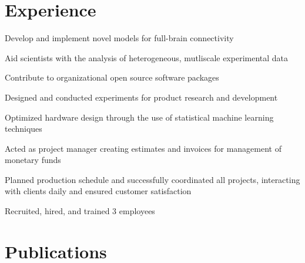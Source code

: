 \documentclass[]{deedy-resume-openfont}
\begin{document}
\begin{minipage}[t]{0.63\textwidth}


\section{Experience}
\vspace{\topsep}
\begin{tightemize}
\item {Develop and implement novel models for full-brain connectivity}
\item {Aid scientists with the analysis of heterogeneous, mutliscale experimental data}
\item {Contribute to organizational open source software packages}
\end{tightemize}
\sectionsep

\begin{tightemize}
\item {Designed and conducted experiments for product research and development}
\item {Optimized hardware design through the use of statistical machine learning techniques}
\end{tightemize}
\sectionsep

\begin{tightemize}
\item {Acted as project manager creating estimates and invoices for management of monetary funds}
\item {Planned production schedule and successfully coordinated all projects, interacting with clients daily and ensured customer satisfaction}
\item {Recruited, hired, and trained 3 employees}
\end{tightemize}
\sectionsep


\section{Publications}
\renewcommand\refname{\vspace{-10mm}} %


\nocite{*}

\end{minipage}
\end{document}
